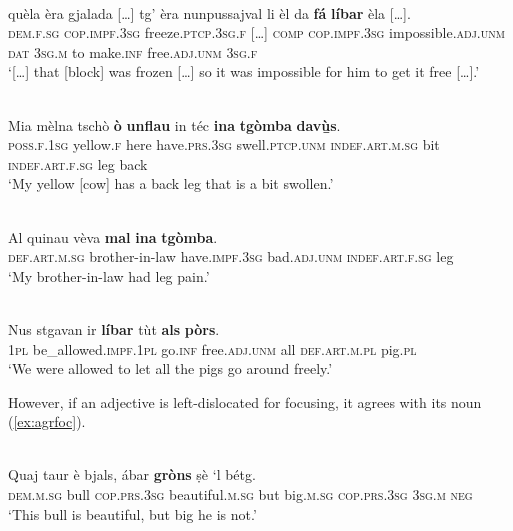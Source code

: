 \ea
\label{ex:noagr:4}
\\
\gll   […] quèla èra gjalada […] tg' èra nunpussajval li èl da \textbf{fá} \textbf{líbar} èla […].\\
      {} \textsc{dem.f.sg} \textsc{cop.impf.3sg} freeze.\textsc{ptcp.3sg.f} […] \textsc{comp} \textsc{cop.impf.3sg} impossible.\textsc{adj.unm} \textsc{dat} \textsc{3sg.m} to make.\textsc{inf} free.\textsc{adj.unm} \textsc{3sg.f}\\
\glt `[…] that [block] was frozen […] so it was impossible for him to get it free […].'
\z

\ea\label{ex:noagr:5}
\\
\gll  Mia mèlna tschò \textbf{ò} \textbf{unflau} in téc \textbf{ina} \textbf{tgòmba} \textbf{davù̱s}.  \\
     \textsc{poss.f.1sg} yellow.\textsc{f} here have.\textsc{prs.3sg} swell.\textsc{ptcp.unm}  \textsc{indef.art.m.sg} bit \textsc{indef.art.f.sg} leg back\\
\glt `My yellow [cow] has a back leg that is a bit swollen.'
\z

\ea
\label{ex:noagr:6}
\\
\gll   Al quinau vèva \textbf{mal} \textbf{ina} \textbf{tgòmba}. \\
\textsc{def.art.m.sg} brother-in-law have.\textsc{impf.3sg} bad.\textsc{adj.unm} \textsc{indef.art.f.sg} leg \\
\glt `My brother-in-law had leg pain.'
\z

\ea
\label{ex:noagr:7}
\\
\gll Nus stgavan ir \textbf{líbar} tùt \textbf{als} \textbf{pòrs}.   \\
 \textsc{1pl} be\_allowed.\textsc{impf.1pl}  go.\textsc{inf} free.\textsc{adj.unm} all  \textsc{def.art.m.pl} pig.\textsc{pl} \\
\glt `We were allowed to let all the pigs go around freely.'
\z

However, if an adjective is left-dislocated for focusing, it agrees with its noun (\ref{ex:agrfoc}).

\ea
\label{ex:agrfoc}
\\
\gll Quaj taur è bjals, ábar \textbf{gròns} ṣè `l bétg.\\
\textsc{dem.m.sg} bull \textsc{cop.prs.3sg} beautiful.\textsc{m.sg} but big.\textsc{m.sg} \textsc{cop.prs.3sg} \textsc{3sg.m} \textsc{neg}\\
\glt `This bull is beautiful, but big he is not.'
\z

